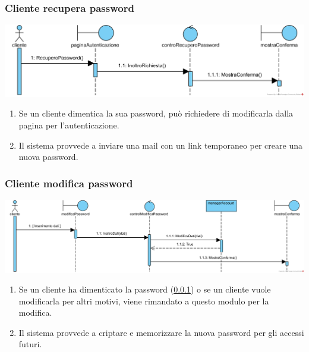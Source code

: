 \documentclass[12pt]{article}
\begin{document}
\subsubsection{Cliente recupera password}
\label{SD:recuperopw}

\begin{center}
\includegraphics[width=\textwidth]{SequenceDiagram/ClientePasswordRecupero}
\end{center}

\begin{enumerate}
\item Se un cliente dimentica la sua password, può richiedere di modificarla dalla pagina per l'autenticazione.
\item Il sistema provvede a inviare una mail con un link temporaneo per creare una nuova password.
\end{enumerate}

\subsubsection{Cliente modifica password}
\label{SD:modificapw}

\begin{center}
\includegraphics[width=\textwidth]{SequenceDiagram/ClientePasswordModifica}
\end{center}

\begin{enumerate}
\item Se un cliente ha dimenticato la password (\ref{SD:recuperopw}) o se un cliente vuole modificarla per altri motivi, viene rimandato a questo modulo per la modifica.
\item Il sistema provvede a criptare e memorizzare la nuova password per gli accessi futuri.
\end{enumerate}
\end{document}
